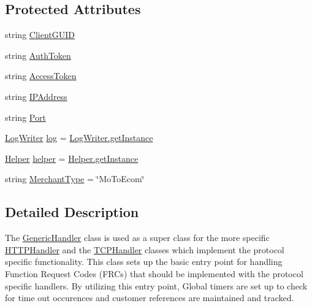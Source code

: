 \subsection*{Protected Attributes}
\begin{DoxyCompactItemize}
\item 
string \mbox{\hyperlink{class_form_sim_1_1_generic_handler_ae1d2175b140f4c600d74bbab1e22714e}{Client\+G\+U\+ID}}
\item 
string \mbox{\hyperlink{class_form_sim_1_1_generic_handler_a6699d8bfc9cd305baf30ab9413b21605}{Auth\+Token}}
\item 
string \mbox{\hyperlink{class_form_sim_1_1_generic_handler_ad47864be2c5790106a7538f640b2792f}{Access\+Token}}
\item 
string \mbox{\hyperlink{class_form_sim_1_1_generic_handler_a12b51dea082a4d40d86829802adf073b}{I\+P\+Address}}
\item 
string \mbox{\hyperlink{class_form_sim_1_1_generic_handler_ac6492bb3e4fbe8f66c97b00bd27020c1}{Port}}
\item 
\mbox{\hyperlink{class_form_sim_1_1_log_writer}{Log\+Writer}} \mbox{\hyperlink{class_form_sim_1_1_generic_handler_ad66bd80f77548cf730fa7b9bcffb3c0e}{log}} = \mbox{\hyperlink{class_form_sim_1_1_log_writer_ac885dc41c236f618e066cdcee8189f64}{Log\+Writer.\+get\+Instance}}
\item 
\mbox{\hyperlink{class_form_sim_1_1_helper}{Helper}} \mbox{\hyperlink{class_form_sim_1_1_generic_handler_a031b68c3e31ae8c99dc60a26d33f5de5}{helper}} = \mbox{\hyperlink{class_form_sim_1_1_helper_ac61d1dca7ce9b1fa7e4ce17e99b0b7e1}{Helper.\+get\+Instance}}
\item 
string \mbox{\hyperlink{class_form_sim_1_1_generic_handler_a8b7d568966660d7d3700eac963caa504}{Merchant\+Type}} = \char`\"{}Mo\+To\+Ecom\char`\"{}
\end{DoxyCompactItemize}


\subsection{Detailed Description}
The \mbox{\hyperlink{class_form_sim_1_1_generic_handler}{Generic\+Handler}} class is used as a super class for the more specific \mbox{\hyperlink{class_form_sim_1_1_h_t_t_p_handler}{H\+T\+T\+P\+Handler}} and the \mbox{\hyperlink{class_form_sim_1_1_t_c_p_handler}{T\+C\+P\+Handler}} classes which implement the protocol specific functionality. This class sets up the basic entry point for handling Function Request Codes (F\+R\+Cs) that should be implemented with the protocol specific handlers. By utilizing this entry point, Global timers are set up to check for time out occurences and customer references are maintained and tracked. 



